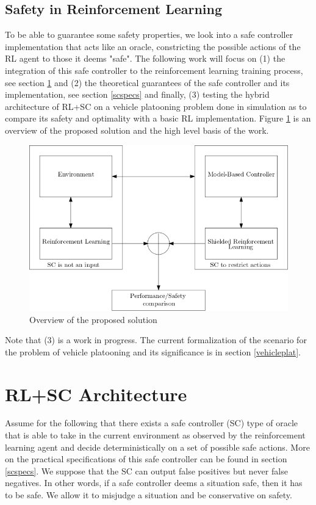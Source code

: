 \documentclass[a4paper,11pt]{article}
\begin{document}
\subsection{Safety in Reinforcement Learning}

To be able to guarantee some safety properties, we look into a safe controller implementation that acts like an oracle, constricting the possible actions 
of the RL agent to those it deems "safe". The following work will focus on (1) the integration of this safe controller to 
the reinforcement learning training process, see section \ref{rlscarchitecture} and (2) the theoretical guarantees of the safe controller and its implementation, see section \ref{scspecs} and finally, (3) testing the hybrid architecture of RL+SC 
on a vehicle platooning problem done in simulation as to compare its safety and optimality with a basic RL implementation.
Figure \ref{fig:overviewsol} is an overview of the proposed solution and the high level basis of the work. 

\begin{figure}[H]
  \centering
  \includegraphics[scale=0.6]{overview.png}
  \caption{Overview of the proposed solution}
  \label{fig:overviewsol}
\end{figure}

Note that (3) is a work in progress. The current formalization of the scenario for the problem of vehicle platooning 
and its significance is in section \ref{vehicleplat}.


\section{RL+SC Architecture} \label{rlscarchitecture}
Assume for the following that there exists a safe controller (SC) type of oracle that is able to take in the current
environment as observed by the reinforcement learning agent and decide deterministically on a set of possible safe actions. 
More on the practical specifications of this safe controller can be found in section \ref{scspecs}. 
We suppose that the SC can output false positives but never false negatives. In other words, if a safe controller deems 
a situation safe, then it has to be safe. We allow it to misjudge a situation and be conservative on safety. 
\end{document}
